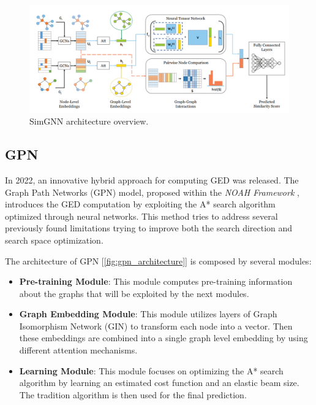 \documentclass[../Thesis.tex]{subfiles}
\begin{document}
	\begin{figure}[H]
		\centering
		\includegraphics[width=\textwidth]{Images/simgnn_architecture.png}
		\caption{SimGNN architecture overview.}
		\label{fig:simgnn_architecture}
	\end{figure}

	
	\subsection{GPN}
	\label{sec:gpn}
	
	In 2022, an innovative hybrid approach for computing GED was released.
	The Graph Path Networks (GPN) model, proposed within the \textit{NOAH Framework} \cite{noah__neural_optimized_a*_search_algorithm_for_graph_edit_distance_computation}, introduces the GED computation by exploiting the A* search algorithm optimized through neural networks. This method tries to address several previously found limitations trying to improve both the search direction and search space optimization.
	
	The architecture of GPN [\autoref{fig:gpn_architecture}] is composed by several modules:
	
	\begin{itemize}
		\item \textbf{Pre-training Module}: This module computes pre-training information about the graphs that will be exploited by the next modules.
		\item \textbf{Graph Embedding Module}: This module utilizes layers of Graph Isomorphism Network (GIN) to transform each node into a vector. Then these embeddings are combined into a single graph level embedding by using different attention mechanisms.
		\item \textbf{Learning Module}: This module focuses on optimizing the A* search algorithm by learning an estimated cost function and an elastic beam size. The tradition algorithm is then used for the final prediction.
	\end{itemize}
	
\end{document}
